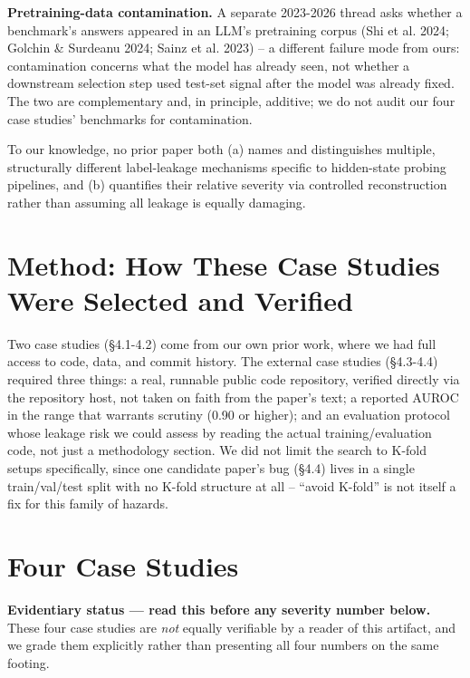 \documentclass[10pt]{article} %
\begin{document}
\textbf{Pretraining-data contamination.} A separate 2023-2026 thread asks
whether a benchmark's answers appeared in an LLM's pretraining corpus
(Shi et al. 2024; Golchin \& Surdeanu 2024; Sainz et al. 2023) -- a
different failure mode from ours: contamination concerns what the model
has already seen, not whether a downstream selection step used test-set
signal after the model was already fixed. The two are complementary and,
in principle, additive; we do not audit our four case studies' benchmarks
for contamination.

To our knowledge, no prior paper both (a) names and distinguishes
multiple, structurally different label-leakage mechanisms specific to
hidden-state probing pipelines, and (b) quantifies their relative
severity via controlled reconstruction rather than assuming all leakage
is equally damaging.

\section{Method: How These Case Studies Were Selected and Verified}

Two case studies (§4.1-4.2) come from our own prior work, where we had
full access to code, data, and commit history. The external case studies
(§4.3-4.4) required three things: a real, runnable public code
repository, verified directly via the repository host, not taken on
faith from the paper's text; a reported AUROC in the range that warrants
scrutiny (0.90 or higher); and an evaluation protocol whose leakage risk
we could assess by reading the actual training/evaluation code, not just
a methodology section. We did not limit the search to K-fold setups
specifically, since one candidate paper's bug (§4.4) lives in a single
train/val/test split with no K-fold structure at all -- ``avoid K-fold'' is
not itself a fix for this family of hazards.

\section{Four Case Studies}

\textbf{Evidentiary status --- read this before any severity number below.}
These four case studies are \emph{not} equally verifiable by a reader of
this artifact, and we grade them explicitly rather than presenting all
four numbers on the same footing.
\end{document}
